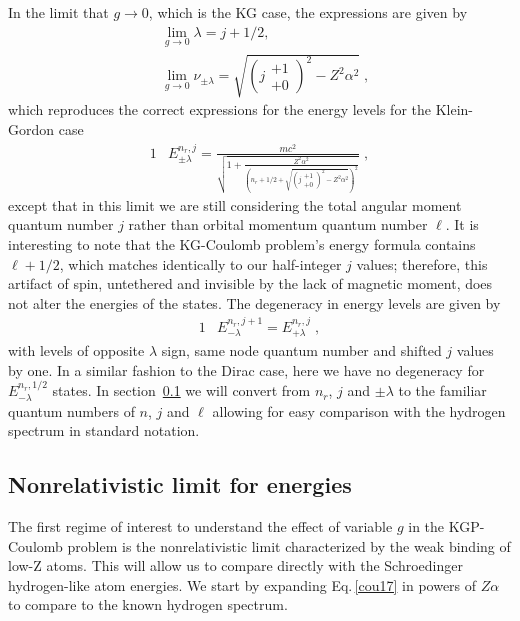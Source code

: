 \documentclass[epj]{svjour}
\begin{document}
In the limit that $g\rightarrow 0$, which is the KG case, the expressions are given by
\begin{subequations}
\begin{alignat}{1}
\label{glimit04} &\lim_{g\rightarrow0}\lambda=j+1/2,\\
&\lim_{g\rightarrow0}\nu_{\pm\lambda}=\sqrt{\left(j\begin{smallmatrix} +1 \\ +0 \end{smallmatrix}\right)^{2}-Z^{2}\alpha^{2}}\;,
\end{alignat}
\end{subequations}
which reproduces the correct expressions for the energy levels for the Klein-Gordon case 
\begin{alignat}{1}
\label{glimit05} &E_{\pm\lambda}^{n_{r},j}=\frac{mc^{2}}{\sqrt{1+\displaystyle\frac{Z^{2}\alpha^{2}}{\left(n_{r}+1/2+\displaystyle\sqrt{\left(j\begin{smallmatrix} +1 \\ +0 \end{smallmatrix}\right)^{2}-Z^{2}\alpha^{2}}\right)^{2}}}}\;,\end{alignat}
except that in this limit we are still considering the total angular moment quantum number $j$ rather than orbital momentum quantum number $\ell$. It is interesting to note that the KG-Coulomb problem\rq s energy formula contains $\ell+1/2$, which matches identically to our half-integer $j$ values; therefore, this artifact of spin, untethered and invisible by the lack of magnetic moment, does not alter the energies of the states. The degeneracy in energy levels are given by 
\begin{alignat}{1}
\label{glimit06} &E^{n_{r},j+1}_{-\lambda}=E^{n_{r},j}_{+\lambda}\;,\end{alignat}
with levels of opposite $\lambda$ sign, same node quantum number and shifted $j$ values by one. In a similar fashion to the Dirac case, here we have no degeneracy for $E^{n_{r},1/2}_{-\lambda}$ states. In section~\ref{nonrel} we will convert from $n_{r}$, $j$ and $\pm\lambda$ to the familiar quantum numbers of $n$, $j$ and $\ell$ allowing for easy comparison with the hydrogen spectrum in standard notation.

\subsection{Nonrelativistic limit for energies} \label{nonrel}
The first regime of interest to understand the effect of variable $g$ in the KGP-Coulomb problem is the nonrelativistic limit characterized by the weak binding of low-Z atoms. This will allow us to compare directly with the Schroedinger hydrogen-like atom energies. We start by expanding Eq.\,\eqref{cou17} in powers of $Z\alpha$ to compare to the known hydrogen spectrum. 
\end{document}

